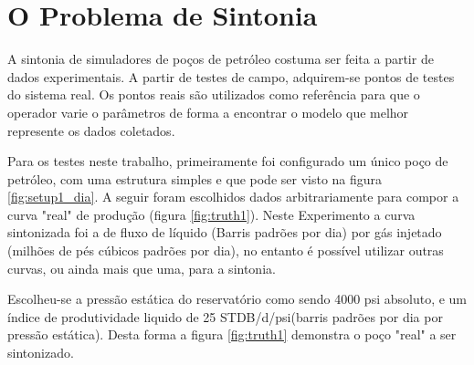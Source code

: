 
\chapter{O Problema de Sintonia} \label{chap:conc}
	

A sintonia de simuladores de poços de petróleo costuma ser feita a partir de dados experimentais. 
%
A partir de testes de campo, adquirem-se pontos de testes do sistema real.
%
Os pontos reais são utilizados como referência para que o operador varie o parâmetros de forma a encontrar o modelo que melhor represente os dados coletados.
%

Para os testes neste trabalho, primeiramente foi configurado um único poço de petróleo, com uma estrutura simples e que pode ser visto na figura \ref{fig:setup1_dia}.
% 
A seguir foram escolhidos dados arbitrariamente para compor a curva "real" de produção (figura \ref{fig:truth1}).
%
Neste Experimento a curva sintonizada foi a de fluxo de líquido (Barris padrões por dia) por gás injetado (milhões de pés cúbicos padrões por dia), no entanto é possível utilizar outras curvas, ou ainda mais que uma, para a sintonia.
%

Escolheu-se a pressão estática do reservatório como sendo 4000 psi absoluto, e um índice de produtividade liquido de 25 STDB/d/psi(barris padrões por dia por pressão estática). 
%
Desta forma a figura \ref{fig:truth1} demonstra o poço "real" a ser sintonizado.



